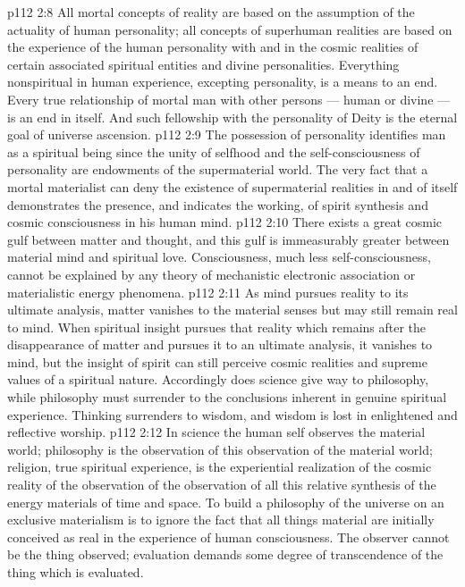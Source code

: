 \vs p112 2:8 All mortal concepts of reality are based on the assumption of the actuality of human personality; all concepts of superhuman realities are based on the experience of the human personality with and in the cosmic realities of certain associated spiritual entities and divine personalities. Everything nonspiritual in human experience, excepting personality, is a means to an end. Every true relationship of mortal man with other persons --- human or divine --- is an end in itself. And such fellowship with the personality of Deity is the eternal goal of universe ascension.
\vs p112 2:9 The possession of personality identifies man as a spiritual being since the unity of selfhood and the self\hyp{}consciousness of personality are endowments of the supermaterial world. The very fact that a mortal materialist can deny the existence of supermaterial realities in and of itself demonstrates the presence, and indicates the working, of spirit synthesis and cosmic consciousness in his human mind.
\vs p112 2:10 There exists a great cosmic gulf between matter and thought, and this gulf is immeasurably greater between material mind and spiritual love. Consciousness, much less self\hyp{}consciousness, cannot be explained by any theory of mechanistic electronic association or materialistic energy phenomena.
\vs p112 2:11 \pc As mind pursues reality to its ultimate analysis, matter vanishes to the material senses but may still remain real to mind. When spiritual insight pursues that reality which remains after the disappearance of matter and pursues it to an ultimate analysis, it vanishes to mind, but the insight of spirit can still perceive cosmic realities and supreme values of a spiritual nature. Accordingly does science give way to philosophy, while philosophy must surrender to the conclusions inherent in genuine spiritual experience. Thinking surrenders to wisdom, and wisdom is lost in enlightened and reflective worship.
\vs p112 2:12 In science the human self observes the material world; philosophy is the observation of this observation of the material world; religion, true spiritual experience, is the experiential realization of the cosmic reality of the observation of the observation of all this relative synthesis of the energy materials of time and space. To build a philosophy of the universe on an exclusive materialism is to ignore the fact that all things material are initially conceived as real in the experience of human consciousness. The observer cannot be the thing observed; evaluation demands some degree of transcendence of the thing which is evaluated.
